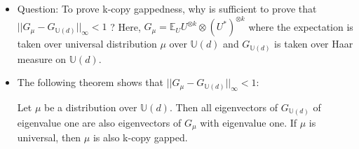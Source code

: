 \documentclass[a4paper]{article}
\begin{document}
\begin{itemize}
\begin{itemize}
\item Question: To prove k-copy gappedness, why is sufficient to prove that \(||G_{\mu} - G_{\mathbb{U}(d)}||_{\infty} < 1\) ? Here, \(G_{\mu} = \mathbb{E}_U U^{\otimes k} \otimes (U^*)^{\otimes k}\) where the expectation is taken over universal distribution \(\mu\) over \(\mathbb{U}(d)\) and \(G_{\mathbb{U}(d)}\) is taken over Haar measure on \(\mathbb{U}(d)\).

\item The following theorem shows that \(||G_{\mu} - G_{\mathbb{U}(d)}||_{\infty} < 1\):

Let \(\mu\) be a distribution over \(\mathbb{U}(d)\). Then all eigenvectors of \(G_{\mathbb{U}(d)}\) of eigenvalue one are also eigenvectors of \(G_{\mu}\) with eigenvalue one. If \(\mu\) is universal, then \(\mu\) is also k-copy gapped.
\end{itemize}
\end{itemize}
\end{document}
